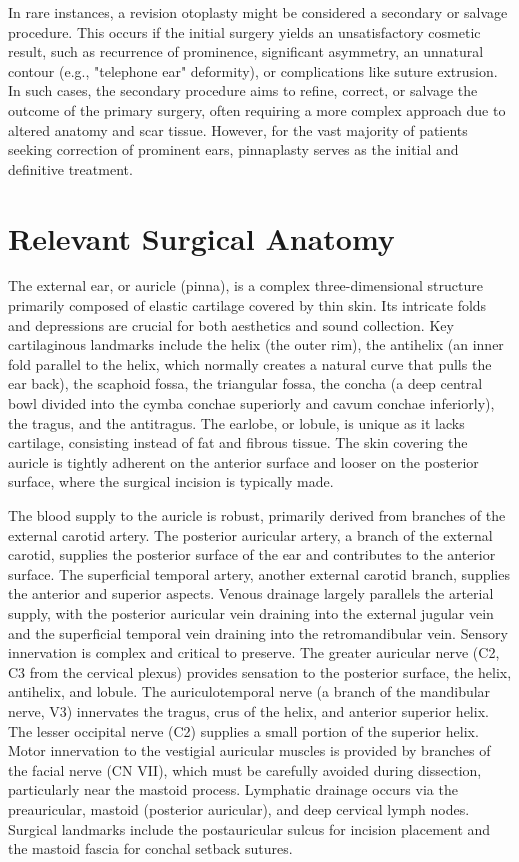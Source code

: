In rare instances, a revision otoplasty might be considered a secondary or salvage procedure. This occurs if the initial surgery yields an unsatisfactory cosmetic result, such as recurrence of prominence, significant asymmetry, an unnatural contour (e.g., "telephone ear" deformity), or complications like suture extrusion. In such cases, the secondary procedure aims to refine, correct, or salvage the outcome of the primary surgery, often requiring a more complex approach due to altered anatomy and scar tissue. However, for the vast majority of patients seeking correction of prominent ears, pinnaplasty serves as the initial and definitive treatment.

\section*{Relevant Surgical Anatomy}
The external ear, or auricle (pinna), is a complex three-dimensional structure primarily composed of elastic cartilage covered by thin skin. Its intricate folds and depressions are crucial for both aesthetics and sound collection. Key cartilaginous landmarks include the helix (the outer rim), the antihelix (an inner fold parallel to the helix, which normally creates a natural curve that pulls the ear back), the scaphoid fossa, the triangular fossa, the concha (a deep central bowl divided into the cymba conchae superiorly and cavum conchae inferiorly), the tragus, and the antitragus. The earlobe, or lobule, is unique as it lacks cartilage, consisting instead of fat and fibrous tissue. The skin covering the auricle is tightly adherent on the anterior surface and looser on the posterior surface, where the surgical incision is typically made.

The blood supply to the auricle is robust, primarily derived from branches of the external carotid artery. The posterior auricular artery, a branch of the external carotid, supplies the posterior surface of the ear and contributes to the anterior surface. The superficial temporal artery, another external carotid branch, supplies the anterior and superior aspects. Venous drainage largely parallels the arterial supply, with the posterior auricular vein draining into the external jugular vein and the superficial temporal vein draining into the retromandibular vein. Sensory innervation is complex and critical to preserve. The greater auricular nerve (C2, C3 from the cervical plexus) provides sensation to the posterior surface, the helix, antihelix, and lobule. The auriculotemporal nerve (a branch of the mandibular nerve, V3) innervates the tragus, crus of the helix, and anterior superior helix. The lesser occipital nerve (C2) supplies a small portion of the superior helix. Motor innervation to the vestigial auricular muscles is provided by branches of the facial nerve (CN VII), which must be carefully avoided during dissection, particularly near the mastoid process. Lymphatic drainage occurs via the preauricular, mastoid (posterior auricular), and deep cervical lymph nodes. Surgical landmarks include the postauricular sulcus for incision placement and the mastoid fascia for conchal setback sutures.

